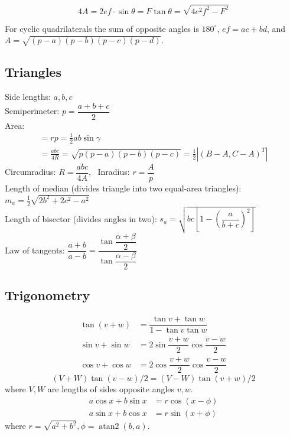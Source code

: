 \documentclass[
	a4paper,
	landscape,
	10pt,
]{article}
\begin{document}
\begin{multicols}{3}
        \[ 4A = 2ef \cdot \sin\theta = F\tan\theta = \sqrt{4e^2f^2-F^2} \]
        
         For cyclic quadrilaterals the sum of opposite angles is $180^\circ$,
        $ef = ac + bd$, and $A = \sqrt{(p-a)(p-b)(p-c)(p-d)}$.
        
        
	\subsection{Triangles}
        Side lengths: $a,b,c$\\
        Semiperimeter: $p=\dfrac{a+b+c}{2}$\\
        Area: %
		\begin{gather*}
			[ABC]
			= rp
			= \frac 12 ab\sin\gamma \\
			= \frac{abc}{4R}
			= \sqrt{p(p-a)(p-b)(p-c)}
			= \frac 12\left| (B-A, C-A)^T \right|
		\end{gather*}
        Circumradius: $R=\dfrac{abc}{4A}$,~
        Inradius: $r=\dfrac{A}{p}$\\
        Length of median (divides triangle into two equal-area triangles): $m_a=\tfrac{1}{2}\sqrt{2b^2+2c^2-a^2}$\\
        Length of bisector (divides angles in two): $s_a=\sqrt{bc\left[1-\left(\dfrac{a}{b+c}\right)^2\right]}$\\
        Law of tangents: $\dfrac{a+b}{a-b}=\dfrac{\tan\dfrac{\alpha+\beta}{2}}{\tan\dfrac{\alpha-\beta}{2}}$

	\subsection{Trigonometry} \vspace{-1cm}
        \begin{align*}
        \tan(v+w)&{}=\dfrac{\tan v+\tan w}{1-\tan v\tan w}\\
        \sin v+\sin w&{}=2\sin\dfrac{v+w}{2}\cos\dfrac{v-w}{2}\\
        \cos v+\cos w&{}=2\cos\dfrac{v+w}{2}\cos\dfrac{v-w}{2}
        \end{align*}
        \[ (V+W)\tan(v-w)/2{}=(V-W)\tan(v+w)/2 \]
        where $V, W$ are lengths of sides opposite angles $v, w$.
        \begin{align*}
        	a\cos x+b\sin x&=r\cos(x-\phi)\\
        	a\sin x+b\cos x&=r\sin(x+\phi)
        \end{align*}
        where $r=\sqrt{a^2+b^2}, \phi=\operatorname{atan2}(b,a)$.
        


\end{multicols}
\end{document}

